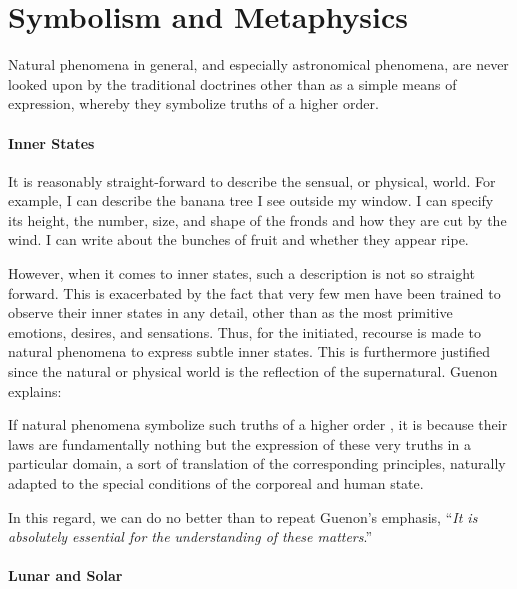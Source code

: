 \section{Symbolism and Metaphysics}

\begin{quotex}
Natural phenomena in general, and especially astronomical phenomena, are never looked upon by the traditional doctrines other than as a simple means of expression, whereby they symbolize truths of a higher order.
\end{quotex}


\paragraph{Inner States}


It is reasonably straight-forward to describe the sensual, or physical, world. For example, I can describe the banana tree I see outside my window. I can specify its height, the number, size, and shape of the fronds and how they are cut by the wind. I can write about the bunches of fruit and whether they appear ripe.

However, when it comes to inner states, such a description is not so straight forward. This is exacerbated by the fact that very few men have been trained to observe their inner states in any detail, other than as the most primitive emotions, desires, and sensations. Thus, for the initiated, recourse is made to natural phenomena to express subtle inner states. This is furthermore justified since the natural or physical world is the reflection of the supernatural. Guenon explains:

\begin{quotex}
If natural phenomena symbolize such truths of a higher order , it is because their laws are fundamentally nothing but the expression of these very truths in a particular domain, a sort of translation of the corresponding principles, naturally adapted to the special conditions of the corporeal and human state.
\end{quotex}


In this regard, we can do no better than to repeat Guenon's emphasis, ``\emph{It is absolutely essential for the understanding of these matters}.''

\paragraph{Lunar and Solar}


